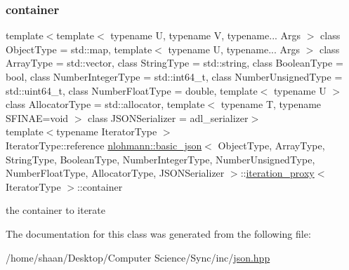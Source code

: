 \subsubsection{\texorpdfstring{container}{container}}
{\footnotesize\ttfamily template$<$template$<$ typename U, typename V, typename... Args $>$ class Object\+Type = std\+::map, template$<$ typename U, typename... Args $>$ class Array\+Type = std\+::vector, class String\+Type  = std\+::string, class Boolean\+Type  = bool, class Number\+Integer\+Type  = std\+::int64\+\_\+t, class Number\+Unsigned\+Type  = std\+::uint64\+\_\+t, class Number\+Float\+Type  = double, template$<$ typename U $>$ class Allocator\+Type = std\+::allocator, template$<$ typename T, typename S\+F\+I\+N\+A\+E=void $>$ class J\+S\+O\+N\+Serializer = adl\+\_\+serializer$>$ \\
template$<$typename Iterator\+Type $>$ \\
Iterator\+Type\+::reference \hyperlink{classnlohmann_1_1basic__json}{nlohmann\+::basic\+\_\+json}$<$ Object\+Type, Array\+Type, String\+Type, Boolean\+Type, Number\+Integer\+Type, Number\+Unsigned\+Type, Number\+Float\+Type, Allocator\+Type, J\+S\+O\+N\+Serializer $>$\+::\hyperlink{classnlohmann_1_1basic__json_1_1iteration__proxy}{iteration\+\_\+proxy}$<$ Iterator\+Type $>$\+::container\hspace{0.3cm}{\ttfamily [private]}}



the container to iterate 



The documentation for this class was generated from the following file\+:\begin{DoxyCompactItemize}
\item 
/home/shaan/\+Desktop/\+Computer Science/\+Sync/inc/\hyperlink{json_8hpp}{json.\+hpp}\end{DoxyCompactItemize}
